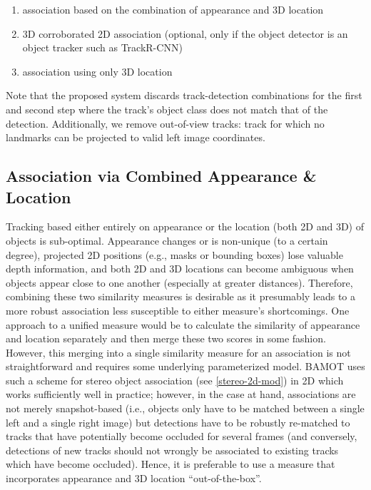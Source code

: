 \documentclass[headsepline, hidelinks, footsepline, footinclude=false, oneside, fontsize=11pt, paper=a4, listof=totoc, bibliography=totoc]{scrbook}
\begin{document}
\begin{enumerate}
\item association based on the combination of appearance and 3D location
\item 3D corroborated 2D association (optional, only if the object detector is an object tracker such as TrackR-CNN)
\item association using only 3D location
\end{enumerate}

Note that the proposed system discards track-detection combinations for the first and second step where the track's object class does not match that of the detection. 
Additionally, we remove out-of-view tracks: track for which no landmarks can be projected to valid left image coordinates.

\subsection{Association via Combined Appearance \& Location \label{combined-assoc}}
\label{sec:org9fe6625}
    Tracking based either entirely on appearance or the location (both 2D and 3D) of objects is sub-optimal. Appearance changes or is non-unique (to a certain degree), projected 2D positions (e.g., masks or bounding boxes) lose
valuable depth information, and both 2D and 3D locations can become ambiguous when objects appear close to one another (especially at greater distances).
Therefore, combining these two similarity measures is desirable as it presumably leads to a more robust association less susceptible to either measure's shortcomings. 
One approach to a unified measure would be to calculate the similarity of appearance and location separately and then merge these two scores in some fashion.
However, this merging into a single similarity measure for an association is not straightforward and requires some underlying parameterized model. BAMOT uses such a scheme for 
stereo object association (see \cref{stereo-2d-mod}) in 2D which works sufficiently well in practice; however, in the case at hand, associations are not merely snapshot-based 
(i.e., objects only have to be matched between a single left and a single right image) but detections have to be robustly re-matched to tracks that have potentially become occluded for several frames 
(and conversely,  detections of new tracks should not wrongly be associated to existing tracks which have become occluded).
Hence, it is preferable to use a measure that incorporates appearance and 3D location ``out-of-the-box''. 
\end{document}
